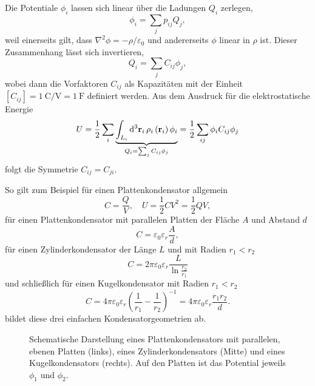 Die Potentiale $\phi _{i}$ lassen sich linear über die Ladungen $Q_{i}$ zerlegen,
\begin{equation*}
	\phi _{i}=\sum _{j}p_{ij}Q_{j},
\end{equation*}
weil einerseits gilt, dass $\nabla ^{2}\phi =-\rho /\varepsilon _{0}$ und andererseits $\phi $ linear in $\rho $ ist. Dieser Zusammenhang lässt sich invertieren,
\begin{equation*}
	Q_{i}=\sum _{j}C_{ij}\phi _{j},
\end{equation*}
wobei dann die Vorfaktoren $C_{ij}$ als Kapazitäten mit der Einheit $\left[C_{ij}\right]=\SI{1}{\coulomb\per\V}=\SI{1}{\farad}$ definiert werden. Aus dem Ausdruck für die elektrostatische Energie
\begin{equation*}
	U=\frac{1}{2}\sum _{i}\underset{Q_{i}=\sum _{j}C_{ij}\phi _{j}}{\underbrace{\int _{L_{i}}\diffa[3]{\vec {r}_{i}}\rho _{i}\left(\vec {r}_{i}\right)\phi _{i}}}=\frac{1}{2}\sum _{ij}\phi _{i}C_{ij}\phi _{j}
\end{equation*}
folgt die Symmetrie $C_{ij}=C_{ji}$.

So gilt zum Beispiel für einen Plattenkondensator allgemein
\begin{equation*}
	C=\frac{Q}{V},\quad U=\frac{1}{2}CV^{2}=\frac{1}{2}QV,
\end{equation*}
für einen Plattenkondensator mit parallelen Platten der Fläche $A$ und Abstand $d$
\begin{equation*}
	C=\varepsilon _{0}\varepsilon _{r}\frac{A}{d},
\end{equation*}
für einen Zylinderkondensator der Länge $L$ und mit Radien $r_{1}<r_{2}$
\begin{equation*}
	C=2\pi \varepsilon _{0}\varepsilon _{r}\frac{L}{\ln \frac{r_{2}}{r_{1}}}
\end{equation*}
und schließlich für einen Kugelkondensator mit Radien $r_{1}<r_{2}$
\begin{equation*}
	C=4\pi \varepsilon _{0}\varepsilon _{r}\left(\frac{1}{r_{1}}-\frac{1}{r_{2}}\right)^{-1}=4\pi \varepsilon _{0}\varepsilon _{r}\frac{r_{1}r_{2}}{d}.
\end{equation*}
 bildet diese drei einfachen Kondensatorgeometrien ab.


\begin{figure}[htb]
	\centering
	\tfigSpecialCapacitors
	\caption{Schematische Darstellung eines Plattenkondensators mit parallelen, ebenen Platten (links), eines Zylinderkondensators (Mitte) und eines Kugelkondensators (rechts). Auf den Platten ist das Potential jeweils $\phi_1$ und $\phi_2$. }
	\label{fig:capacitors}
\end{figure}



